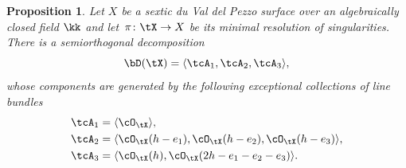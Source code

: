 \documentclass[11pt]{amsart}
\renewcommand{\P}{{\mathbb{P}}}
\theoremstyle{plain}
\newtheorem{proposition}[theorem]{Proposition}
\theoremstyle{definition}
\theoremstyle{remark}
\begin{document}
\begin{proposition}
\label{proposition:tx-excol}
Let $X$ be a sextic du Val del Pezzo surface over an algebraically closed field $\kk$ 
and let~$\pi \colon \tX \to X$ be its minimal resolution of singularities. 
There is a semiorthogonal decomposition
\begin{equation}
\label{eq:dbtx}
\bD(\tX) = \langle \tcA_1, \tcA_2, \tcA_3  \rangle,
\end{equation}
whose components are generated by the following exceptional collections of line bundles
\begin{equation}
\begin{aligned}
\label{eq:tx-excol}
\tcA_1 &= \langle \cO_\tX \rangle,\\
\tcA_2 &= \langle \cO_\tX(h - e_1), \cO_\tX(h - e_2), \cO_\tX(h - e_3) \rangle,\\
\tcA_3 &= \langle \cO_\tX(h), \cO_\tX(2h - e_1 - e_2 - e_3) \rangle. 
\end{aligned}
\end{equation} 
\end{proposition}


% 
\end{document}
